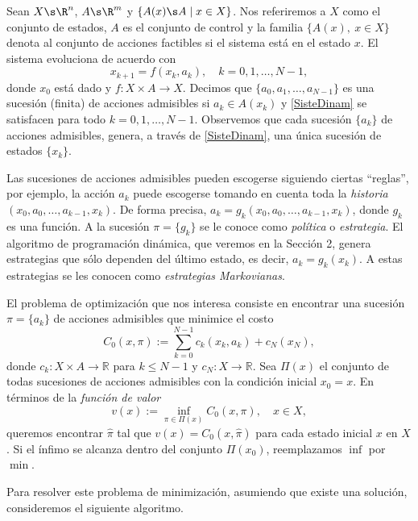 
	Sean $X\s \R^n$, $A\s\R^m$ y $\{A(x)\s A\mid x\in X\}$. Nos referiremos a $X$ 
como el 
conjunto de estados, $A$ es el conjunto de control y la familia 
$\{A(x),\ x\in X\}$ 
denota al conjunto de acciones factibles si el sistema está en el estado $x$. 
El 
sistema evoluciona de acuerdo con
\begin{equation}\label{SisteDinam}
	x_{k+1}=f(x_k,a_k), \quad k=0,1,\ldots,N-1,
\end{equation}
donde $x_0$ está dado y $f:X\times A\to X$. 
Decimos que $\{a_0,a_1,\ldots,a_{N-1}\}$ es una sucesión (finita) de acciones 
admisibles si  $a_k\in A(x_k)$ y \eqref{SisteDinam} se satisfacen para todo 
$k=0,1,\ldots,N-1$. Observemos que cada sucesión $\{a_k\}$ de acciones 
admisibles, genera, a través de \eqref{SisteDinam}, una única sucesión de 
estados $\{x_k\}$.

Las sucesiones de acciones admisibles pueden escogerse siguiendo ciertas 
``reglas'', por ejemplo, la acción $a_k$ puede escogerse tomando en cuenta toda 
la {\it historia} 
$(x_0,a_0,\ldots,a_{k-1},x_k)$. De forma precisa, 
$a_k=g_k(x_0,a_0,\ldots,a_{k-1},x_k)$, donde $g_k$ es una función. 
A la sucesión $\pi=\{g_k\}$ se le conoce como {\it política} 
o {\it estrategia}. El algoritmo de programación dinámica, que veremos en la 
Sección 2, genera estrategias que sólo dependen del último estado, es decir, 
$a_k=g_k(x_k)$. A estas estrategias se les conocen como 
{\it estrategias Markovianas}.

El problema de optimización que nos interesa consiste en encontrar una sucesión 
$\pi=\{a_k\}$ de acciones admisibles que minimice el costo  
\begin{equation}\label{FinHorPerInd}
	C_0(x,\pi):=\sum_{k=0}^{N-1}c_k(x_k,a_k) + c_N(x_N),
\end{equation} 
donde $c_k:X\times A\to \mathbb{R}$ para $k\leq N-1$ y $c_N:X\to \mathbb{R}$.
Sea  $\Pi(x)$ el conjunto de todas sucesiones de acciones 
admisibles con la condición inicial $x_0=x$. En términos de la {\it función de 
valor} 
\[
	v(x):=
		\inf_{\pi\in\Pi(x)}C_0(x,\pi),\quad x\in X,
\] 
queremos encontrar $\hat{\pi}$ tal que  $v(x)=C_0(x,\hat{\pi})$ para cada 
estado 
inicial $x$ en $X$. Si el ínfimo se alcanza dentro del conjunto $\Pi(x_0)$, 
reemplazamos $\inf$ por $\min$. 

Para resolver este problema de minimización, asumiendo que existe una solución,
consideremos el siguiente algoritmo.\medskip

\medskip

